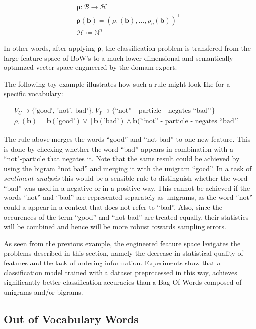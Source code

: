 \begin{eqnarray*}
\boldsymbol\rho: \mathcal{B} \to \mathcal{H} \\
\boldsymbol{\rho}(\mathbf{b}) = (\rho_1(\mathbf{b}), \ldots,
\rho_n(\mathbf{b}))^\intercal \\
\mathcal{H} \coloneqq \mathbb{N}^n
\end{eqnarray*}

In other words, after applying $\boldsymbol\rho$, the classification problem is
transfered from the large feature space of BoW's to a much lower dimensional and semantically optimized
vector space engineered by the domain expert.

The following toy example illustrates how such a rule might look
like for a specific vocabulary: 

\begin{eqnarray*}
V_U \supset \{\text{'good', 'not', bad'}\}, V_P \supset \{\text{``not'' - particle -
negates\ ``bad"'}\} \\
\rho_1(\mathbf{b}) = \mathbf{b}(\text{'good'}) \lor \left[\mathbf{b}(\text{'bad'})
\land \mathbf{b}(\text{'``not'' - particle - negates\ ``bad"'}\right]
\end{eqnarray*}

The rule above merges the words ``good'' and ``not bad'' to one new feature.
This is done by checking whether the word ``bad'' appears in combination with a
``not"-particle that negates it. Note that the same result could be achieved
by using the bigram ``not bad'' and merging it with the unigram ``good''.
In a task of \emph{sentiment analysis} this would be a sensible rule to
distinguish whether the word ``bad'' was used in a negative or in a positive
way. This cannot be achieved if the words ``not''
and ``bad'' are represented separately as unigrams, as the word ``not'' could a
appear in a context that does not refer to ``bad''.
Also, since the occurences of the term ``good'' and ``not bad'' are treated
equally, their statistics will be combined and hence will be more robust towards
sampling errors.

As seen from the previous example, the engineered feature space levigates the
problems described in this section, namely the decrease in statistical quality of
features and the lack of ordering information. Experiments show that a
classification model trained with a dataset preprocessed in this way, achieves significantly 
better classification accuracies than a Bag-Of-Words composed of unigrams and/or
bigrams.

\subsection{Out of Vocabulary Words}
\label{sec:problem-statement}

